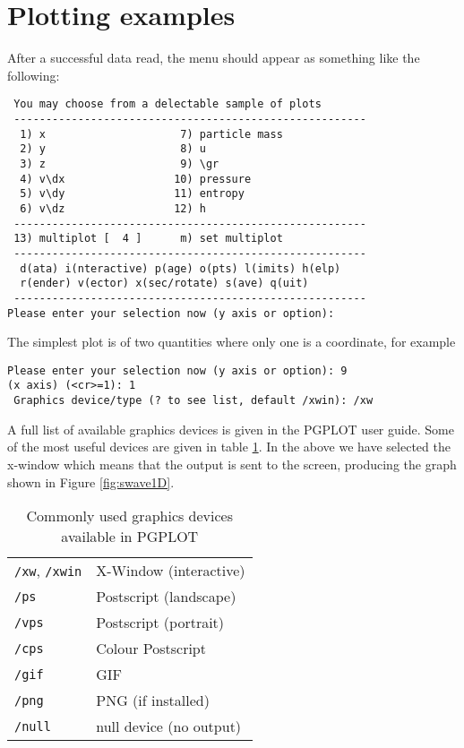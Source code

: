 \documentclass[a4paper,12pt]{article}
\begin{document}
\section{Plotting examples}
After a successful data read, the menu should appear as something like the
following:
\begin{verbatim}
 You may choose from a delectable sample of plots
 -------------------------------------------------------
  1) x                     7) particle mass
  2) y                     8) u
  3) z                     9) \gr
  4) v\dx                 10) pressure
  5) v\dy                 11) entropy
  6) v\dz                 12) h
 -------------------------------------------------------
 13) multiplot [  4 ]      m) set multiplot
 -------------------------------------------------------
  d(ata) i(nteractive) p(age) o(pts) l(imits) h(elp)
  r(ender) v(ector) x(sec/rotate) s(ave) q(uit)
 -------------------------------------------------------
Please enter your selection now (y axis or option):
\end{verbatim}
The simplest plot is of two quantities where only one is a coordinate, for
example
\begin{verbatim}
Please enter your selection now (y axis or option): 9
(x axis) (<cr>=1): 1
 Graphics device/type (? to see list, default /xwin): /xw
\end{verbatim}
 A full list of available graphics devices is given in the PGPLOT user guide.
Some of the most useful devices are given in table \ref{tab:devices}. In the
above we have selected the x-window which means that the output is sent to the
screen, producing the graph shown in Figure \ref{fig:swave1D}.
\begin{table}[h]
\centering
\begin{tabular}{|l|l|}
\hline
\verb+/xw+, \verb+/xwin+ & X-Window (interactive) \\
\verb+/ps+ & Postscript (landscape) \\
\verb+/vps+ & Postscript (portrait) \\
\verb+/cps+ & Colour Postscript \\
\verb+/gif+ & GIF \\
\verb+/png+ & PNG (if installed) \\
\verb+/null+ & null device (no output) \\
\hline
\end{tabular}
\caption{Commonly used graphics devices available in PGPLOT}
\label{tab:devices}
\end{table}
\end{document}

